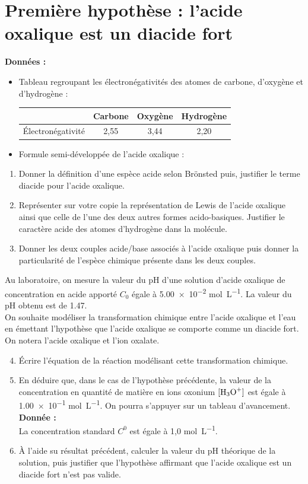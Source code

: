 \documentclass[a4paper,11pt]{article}
\begin{document}
\section{Première hypothèse : l'acide oxalique est un diacide fort}
\textbf{Données :}
\begin{itemize}
    \item Tableau regroupant les électronégativités des atomes de carbone, d'oxygène et d'hydrogène :\\
    \begin{tabular}{|c|c|c|c|}
    \hline & Carbone & Oxygène & Hydrogène  \\
    \hline Électronégativité & 2,55 & 3,44 & 2,20\\
    \hline
    \end{tabular}
    \item Formule semi-développée de l'acide oxalique :\\
    \begin{center} 
    \end{center}
\end{itemize}
\begin{enumerate}
    \item Donner la définition d'une espèce acide selon Brönsted puis, justifier le terme diacide pour l'acide oxalique.
    \item Représenter sur votre copie la représentation de Lewis de l'acide oxalique ainsi que celle de l'une des deux autres formes acido-basiques. Justifier le caractère acide des atomes d'hydrogène dans la molécule.
    \item Donner les deux couples acide/base associés à l'acide oxalique puis donner la particularité de l'espèce chimique présente dans les deux couples.
\end{enumerate}
Au laboratoire, on mesure la valeur du pH d'une solution d'acide oxalique de concentration en acide apporté $C_0$ égale à \num{5,00e-2} \unit{\mole\per\liter}. La valeur du pH obtenu est de \num{1,47}.\\
On souhaite modéliser la transformation chimique entre l'acide oxalique et l'eau en émettant l'hypothèse que l'acide oxalique se comporte comme un diacide fort. On notera  l'acide oxalique et  l'ion oxalate.
\begin{enumerate}
\setcounter{enumi}{3}
    \item Écrire l'équation de la réaction modélisant cette transformation chimique.
    \item En déduire que, dans le cas de l'hypothèse précédente, la valeur de la concentration en quantité de matière en ions oxonium $[\ce{H3O+}]$ est égale à \num{1,00e-1} \unit{\mole\per\liter}. On pourra s'appuyer sur un tableau d'avancement.\\
    \textbf{Donnée :}\\
    La concentration standard $C^0$ est égale à 1,0 \unit{\mole\per\liter}.
    \item À l'aide su résultat précédent, calculer la valeur du pH théorique de la solution, puis justifier que l'hypothèse affirmant que l'acide oxalique est un diacide fort n'est pas valide.
\end{enumerate}
\end{document}

